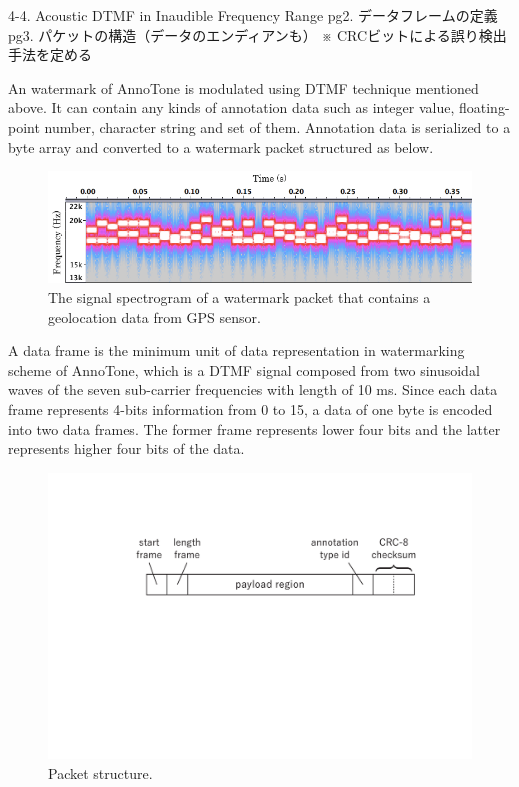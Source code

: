 4-4. Acoustic DTMF in Inaudible Frequency Range
	pg2. データフレームの定義
	pg3. パケットの構造（データのエンディアンも）
	※ CRCビットによる誤り検出手法を定める
\fi

An watermark of AnnoTone is modulated using DTMF technique mentioned above.
It can contain any kinds of annotation data such as integer value, floating-point number, character string and set of them.
Annotation data is serialized to a byte array and converted to a watermark packet structured as below.

\begin{figure}[htbp]
 \begin{center}
  \includegraphics[width=120mm]{watermarking_spectrogram.png}
 \end{center}
 \caption{The signal spectrogram of a watermark packet that contains a geolocation data from GPS sensor.}
 \label{fig:watr_spec}
\end{figure}

A data frame is the minimum unit of data representation in watermarking scheme of AnnoTone, which is a DTMF signal composed from two sinusoidal waves of the seven sub-carrier frequencies with length of 10 ms.
Since each data frame represents 4-bits information from 0 to 15, a data of one byte is encoded into two data frames.
The former frame represents lower four bits and the latter represents higher four bits of the data.

\begin{figure}[htbp]
 \begin{center}
  \includegraphics[width=120mm]{watermarking_packet.pdf}
 \end{center}
 \caption{Packet structure.}
 \label{fig:watr_pack}
\end{figure}

